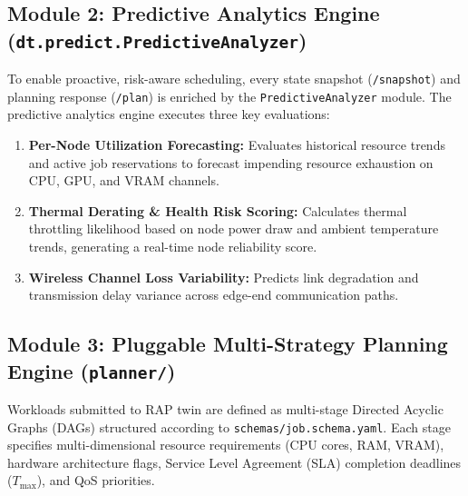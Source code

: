 \documentclass[twoside,twocolumn,10pt]{article}
\begin{document}
\subsection{Module 2: Predictive Analytics Engine (\texttt{dt.predict.PredictiveAnalyzer})}
To enable proactive, risk-aware scheduling, every state snapshot (\texttt{/snapshot}) and planning response (\texttt{/plan}) is enriched by the \texttt{PredictiveAnalyzer} module. The predictive analytics engine executes three key evaluations:
\begin{enumerate}
    \item \textbf{Per-Node Utilization Forecasting:} Evaluates historical resource trends and active job reservations to forecast impending resource exhaustion on CPU, GPU, and VRAM channels.
    \item \textbf{Thermal Derating \& Health Risk Scoring:} Calculates thermal throttling likelihood based on node power draw and ambient temperature trends, generating a real-time node reliability score.
    \item \textbf{Wireless Channel Loss Variability:} Predicts link degradation and transmission delay variance across edge-end communication paths.
\end{enumerate}

\subsection{Module 3: Pluggable Multi-Strategy Planning Engine (\texttt{planner/})}
Workloads submitted to RAP twin are defined as multi-stage Directed Acyclic Graphs (DAGs) structured according to \texttt{schemas/job.schema.yaml}. Each stage specifies multi-dimensional resource requirements (CPU cores, RAM, VRAM), hardware architecture flags, Service Level Agreement (SLA) completion deadlines ($T_{\max}$), and QoS priorities.
\end{document}
